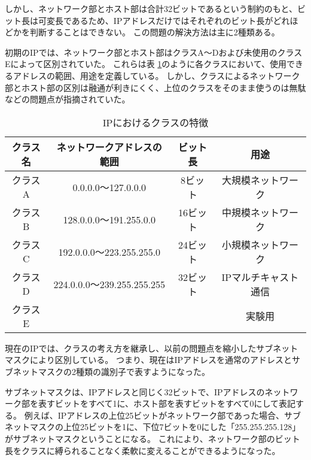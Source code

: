しかし、ネットワーク部とホスト部は合計32ビットであるという制約のもと、ビット長は可変長であるため、IPアドレスだけではそれぞれのビット長がどれほどかを判断することはできない。
この問題の解決方法は主に2種類ある。

初期のIPでは、ネットワーク部とホスト部はクラスA～Dおよび未使用のクラスEによって区別されていた。
これらは表 \ref{tab:2-3}のように各クラスにおいて、使用できるアドレスの範囲、用途を定義している。
しかし、クラスによるネットワーク部とホスト部の区別は融通が利きにくく、上位のクラスをそのまま使うのは無駄などの問題点が指摘されていた。

\begin{table}[tb]
	\begin{center}
		\caption{IPにおけるクラスの特徴}
		\begin{tabular}{c|c|c|c}
			\hline \hline
			クラス名 & ネットワークアドレスの範囲 & ビット長 & 用途　\\ \hline
			クラスA & 0.0.0.0～127.0.0.0 & 8ビット & 大規模ネットワーク\\
			クラスB & 128.0.0.0～191.255.0.0 & 16ビット & 中規模ネットワーク \\
			クラスC & 192.0.0.0～223.255.255.0 & 24ビット & 小規模ネットワーク \\
			クラスD & 224.0.0.0～239.255.255.255 & 32ビット & IPマルチキャスト通信\\
			クラスE & & & 実験用　\\ \hline
		\end{tabular}
		\label{tab:2-3}
	\end{center}
\end{table}

現在のIPでは、クラスの考え方を継承し、以前の問題点を縮小したサブネットマスクにより区別している。
つまり、現在はIPアドレスを通常のアドレスとサブネットマスクの2種類の識別子で表すようになった。

サブネットマスクは、IPアドレスと同じく32ビットで、IPアドレスのネットワーク部を表すビットをすべて1に、ホスト部を表すビットをすべて0にして表記する。
例えば、IPアドレスの上位25ビットがネットワーク部であった場合、サブネットマスクの上位25ビットを1に、下位7ビットを0にした「255.255.255.128」がサブネットマスクということになる。
これにより、ネットワーク部のビット長をクラスに縛られることなく柔軟に変えることができるようになった。